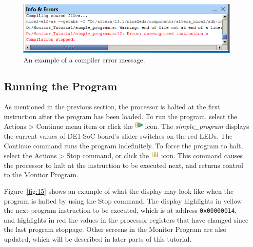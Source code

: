 \documentclass[11pt, twoside, pdftex]{article}
\begin{document}
\begin{figure}[H]
   \begin{center}
      \includegraphics[scale=1]{screenshots/figure14.png}
   \end{center}
   \caption{An example of a compiler error message.} 
	 \label{fig:14}
\end{figure}


\subsection{Running the Program}

As mentioned in the previous section, the processor is halted at
the first instruction after the program has been loaded. 
To run the program, select the \textsf{Actions > Continue} menu
item or click the \includegraphics{toolbar/continue.png} icon.  The {\it simple\_program} displays the current values of
DE1-SoC board's slider switches on the red LEDs.
The \textsf{Continue} command runs the program indefinitely.
To force the program to halt,
select the \textsf{Actions > Stop} command, or click the
\includegraphics{toolbar/stop.png} icon. This command causes the
processor to halt at the instruction to be executed next, and
returns control to the Monitor Program. 

Figure~\ref{fig:15} shows an example of what the display may look like when
the program is halted by using the {\sf Stop} command. 
The display highlights in yellow the next program instruction to
be executed, which is at address \texttt {0x00000014},
and highlights in red the values in the processor
registers that have changed since the last program stoppage.
Other screens in the Monitor Program are also updated, which will
be described in later parts of this tutorial.
\end{document}
